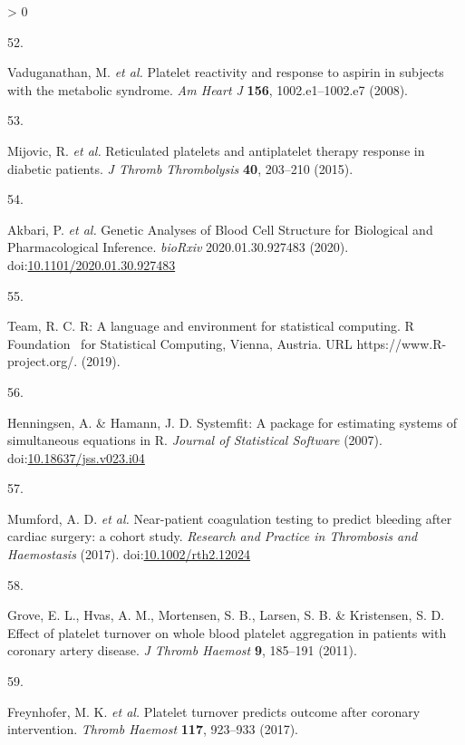 \documentclass[11pt,twoside]{bristolthesis}
\newlength{\cslhangindent}
\newlength{\csllabelwidth}
\newenvironment{CSLReferences}[2] %
 {%
  \setlength{\parindent}{0pt}
  \ifodd #1 \everypar{\setlength{\hangindent}{\cslhangindent}}\ignorespaces\fi
  \ifnum #2 > 0
  \setlength{\parskip}{#2\baselineskip}
  \fi
 }%
 {}
\newcommand{\CSLLeftMargin}[1]{\parbox[t]{\csllabelwidth}{#1}}
\newcommand{\CSLRightInline}[1]{\parbox[t]{\linewidth - \csllabelwidth}{#1}\break}
\begin{document}
\begin{CSLReferences}{0}{0}
\leavevmode\hypertarget{ref-Vaduganathan2008a}{}%
\CSLLeftMargin{52. }
\CSLRightInline{Vaduganathan, M. \emph{et al.} {Platelet reactivity and response to aspirin in subjects with the metabolic syndrome}. \emph{Am Heart J} \textbf{156}, 1002.e1--1002.e7 (2008).}

\leavevmode\hypertarget{ref-Mijovic2015a}{}%
\CSLLeftMargin{53. }
\CSLRightInline{Mijovic, R. \emph{et al.} {Reticulated platelets and antiplatelet therapy response in diabetic patients}. \emph{J Thromb Thrombolysis} \textbf{40}, 203--210 (2015).}

\leavevmode\hypertarget{ref-Akbari2020}{}%
\CSLLeftMargin{54. }
\CSLRightInline{Akbari, P. \emph{et al.} {Genetic Analyses of Blood Cell Structure for Biological and Pharmacological Inference}. \emph{bioRxiv} 2020.01.30.927483 (2020). doi:\href{https://doi.org/10.1101/2020.01.30.927483}{10.1101/2020.01.30.927483}}

\leavevmode\hypertarget{ref-Team2019a}{}%
\CSLLeftMargin{55. }
\CSLRightInline{Team, R. C. {R: A language and environment for statistical computing. R Foundation~ for Statistical Computing, Vienna, Austria. URL https://www.R-project.org/.} (2019).}

\leavevmode\hypertarget{ref-Henningsen2007}{}%
\CSLLeftMargin{56. }
\CSLRightInline{Henningsen, A. \& Hamann, J. D. {Systemfit: A package for estimating systems of simultaneous equations in R}. \emph{Journal of Statistical Software} (2007). doi:\href{https://doi.org/10.18637/jss.v023.i04}{10.18637/jss.v023.i04}}

\leavevmode\hypertarget{ref-Mumford2017}{}%
\CSLLeftMargin{57. }
\CSLRightInline{Mumford, A. D. \emph{et al.} {Near-patient coagulation testing to predict bleeding after cardiac surgery: a cohort study}. \emph{Research and Practice in Thrombosis and Haemostasis} (2017). doi:\href{https://doi.org/10.1002/rth2.12024}{10.1002/rth2.12024}}

\leavevmode\hypertarget{ref-Grove2011a}{}%
\CSLLeftMargin{58. }
\CSLRightInline{Grove, E. L., Hvas, A. M., Mortensen, S. B., Larsen, S. B. \& Kristensen, S. D. {Effect of platelet turnover on whole blood platelet aggregation in patients with coronary artery disease}. \emph{J Thromb Haemost} \textbf{9}, 185--191 (2011).}

\leavevmode\hypertarget{ref-Freynhofer2017a}{}%
\CSLLeftMargin{59. }
\CSLRightInline{Freynhofer, M. K. \emph{et al.} {Platelet turnover predicts outcome after coronary intervention}. \emph{Thromb Haemost} \textbf{117}, 923--933 (2017).}


\end{CSLReferences}
\end{document}

